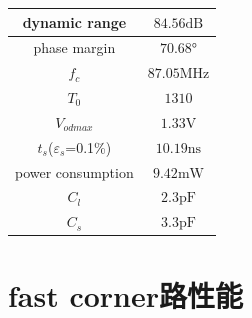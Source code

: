 \documentclass[a4paper]{article}
\newcommand{\uV}{\si{\volt}}
\newcommand{\upF}{\si{\pico\farad}}
\newcommand{\uns}{\si{\nano\second}}
\newcommand{\umW}{\si{\milli\watt}}
\newcommand{\uMHz}{\si{\mega\hertz}}
\newcommand{\udB}{\si{\deci\bel}}
\newcommand{\udeg}{\si{\degree}}
\begin{document}
\begin{table}[htbp]
    \begin{tabular}{|c|c|}
        \\\hline
        dynamic range&$84.56\udB$
        \\\hline
        phase margin&$70.68\udeg$
        \\\hline
        $f_c$ &$87.05\uMHz$
        \\\hline 
        $T_0$&$1310$
        \\\hline
        $V_{odmax}$&$1.33\uV$
        \\\hline
        $t_s$($\varepsilon_s$=0.1\%)&$10.19\uns$
        \\\hline
        power consumption&$9.42\umW$
        \\\hline
        $C_l$&$2.3\upF$
        \\\hline
        $C_s$&$3.3\upF$
        \\\hline
    \end{tabular}
\end{table}
\newpage
\clearpage

\section{fast corner路性能}
\end{document}
